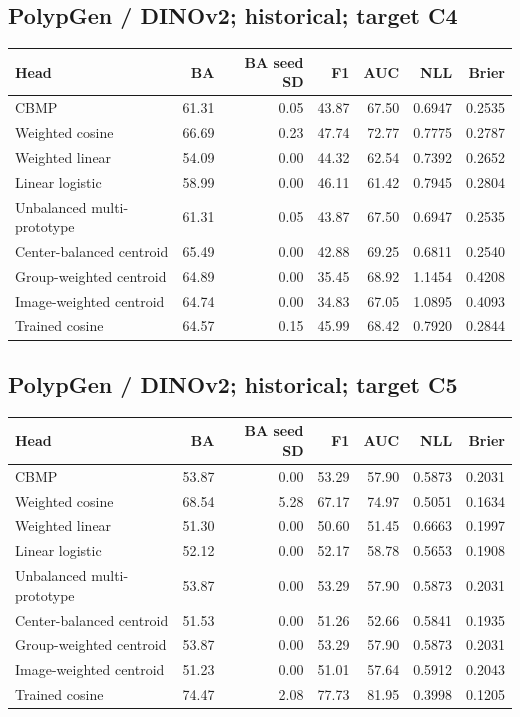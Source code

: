 \subsection*{PolypGen / DINOv2; historical; target C4}
\begingroup\small\setlength{\tabcolsep}{3pt}
\begin{longtable}{lrrrrrr}
\toprule Head & BA & BA seed SD & F1 & AUC & NLL & Brier \\
\midrule
CBMP & 61.31 & 0.05 & 43.87 & 67.50 & 0.6947 & 0.2535 \\
Weighted cosine & 66.69 & 0.23 & 47.74 & 72.77 & 0.7775 & 0.2787 \\
Weighted linear & 54.09 & 0.00 & 44.32 & 62.54 & 0.7392 & 0.2652 \\
Linear logistic & 58.99 & 0.00 & 46.11 & 61.42 & 0.7945 & 0.2804 \\
Unbalanced multi-prototype & 61.31 & 0.05 & 43.87 & 67.50 & 0.6947 & 0.2535 \\
Center-balanced centroid & 65.49 & 0.00 & 42.88 & 69.25 & 0.6811 & 0.2540 \\
Group-weighted centroid & 64.89 & 0.00 & 35.45 & 68.92 & 1.1454 & 0.4208 \\
Image-weighted centroid & 64.74 & 0.00 & 34.83 & 67.05 & 1.0895 & 0.4093 \\
Trained cosine & 64.57 & 0.15 & 45.99 & 68.42 & 0.7920 & 0.2844 \\
\bottomrule
\end{longtable}
\endgroup
\subsection*{PolypGen / DINOv2; historical; target C5}
\begingroup\small\setlength{\tabcolsep}{3pt}
\begin{longtable}{lrrrrrr}
\toprule Head & BA & BA seed SD & F1 & AUC & NLL & Brier \\
\midrule
CBMP & 53.87 & 0.00 & 53.29 & 57.90 & 0.5873 & 0.2031 \\
Weighted cosine & 68.54 & 5.28 & 67.17 & 74.97 & 0.5051 & 0.1634 \\
Weighted linear & 51.30 & 0.00 & 50.60 & 51.45 & 0.6663 & 0.1997 \\
Linear logistic & 52.12 & 0.00 & 52.17 & 58.78 & 0.5653 & 0.1908 \\
Unbalanced multi-prototype & 53.87 & 0.00 & 53.29 & 57.90 & 0.5873 & 0.2031 \\
Center-balanced centroid & 51.53 & 0.00 & 51.26 & 52.66 & 0.5841 & 0.1935 \\
Group-weighted centroid & 53.87 & 0.00 & 53.29 & 57.90 & 0.5873 & 0.2031 \\
Image-weighted centroid & 51.23 & 0.00 & 51.01 & 57.64 & 0.5912 & 0.2043 \\
Trained cosine & 74.47 & 2.08 & 77.73 & 81.95 & 0.3998 & 0.1205 \\
\bottomrule
\end{longtable}
\endgroup
